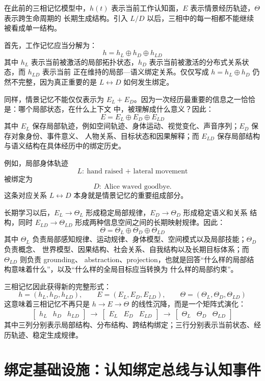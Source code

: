 在此前的三相记忆模型中，$h(t)$ 表示当前工作认知面，$E$ 表示情景经历轨迹，$\Theta$ 表示跨生命周期的
长期生成结构。引入 $L/D$ 以后，三相中的每一相都不能继续被看成单一结构。

首先，工作记忆应当分解为：
\[
\boxed{
h=h_L\oplus h_D\oplus h_{LD}
}
\]
其中 $h_L$ 表示当前被激活的局部拓扑状态，$h_D$ 表示当前被激活的分布式关系状态，而 $h_{LD}$ 表示当前
正在维持的局部—语义绑定关系。仅仅写成 $h=h_L\oplus h_D$ 仍然不完整，因为真正重要的是
$L\leftrightarrow D$ 如何发生绑定。

同样，情景记忆不能仅仅表示为 $E_L+E_D$。因为一次经历最重要的信息之一恰恰是：哪个局部状态，在什么上下文
中，被理解成什么意义？因此：
\[
\boxed{
E=E_L\oplus E_D\oplus E_{LD}
}
\]
其中 $E_L$ 保存局部轨迹，例如空间轨迹、身体运动、视觉变化、声音序列；$E_D$ 保存对象身份、事件意义、
人物关系、目标状态和因果解释；而 $E_{LD}$ 保存局部结构与语义结构在具体经历中的绑定历史。

例如，局部身体轨迹
\[
L:\ \text{hand raised + lateral movement}
\]
被绑定为
\[
D:\ \text{Alice waved goodbye}.
\]
这条对应关系 $L\leftrightarrow D$ 本身就是情景记忆的重要组成部分。

长期学习以后，$E_L\rightarrow\Theta_L$ 形成稳定局部规律，$E_D\rightarrow\Theta_D$ 形成稳定语义和关系
结构，同时 $E_{LD}\rightarrow\Theta_{LD}$ 形成两种信息空间之间的长期映射规律。因此：
\[
\boxed{
\Theta=\Theta_L\oplus\Theta_D\oplus\Theta_{LD}
}
\]
其中 $\Theta_L$ 负责局部感知规律、运动规律、身体模型、空间模式以及局部技能；$\Theta_D$ 负责概念、
世界模型、因果结构、社会关系、自我结构以及长期目标体系；而 $\Theta_{LD}$ 则负责 grounding、
abstraction、projection，也就是回答“什么样的局部结构意味着什么”，以及“什么样的全局目标应当转换为
什么样的局部约束”。

三相记忆因此获得新的完整形式：
\[
\boxed{
h=(h_L,h_D,h_{LD}),\qquad
E=(E_L,E_D,E_{LD}),\qquad
\Theta=(\Theta_L,\Theta_D,\Theta_{LD})
}
\]
这意味着三相记忆不再只是 $h\rightarrow E\rightarrow\Theta$ 的线性沉降，而是一个矩阵式演化：
\[
\begin{bmatrix}h_L & h_D & h_{LD}\end{bmatrix}
\ \longrightarrow\
\begin{bmatrix}E_L & E_D & E_{LD}\end{bmatrix}
\ \longrightarrow\
\begin{bmatrix}\Theta_L & \Theta_D & \Theta_{LD}\end{bmatrix}
\]
其中三列分别表示局部结构、分布结构、跨结构绑定；三行分别表示当前状态、经历轨迹、稳定生成规律。

\section{绑定基础设施：认知绑定总线与认知事件}

